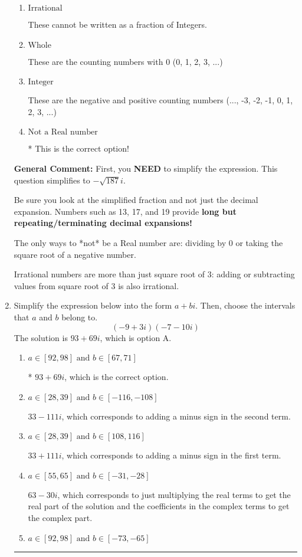 \documentclass{extbook}[14pt]
\newcommand{\litem}[1]{\item #1

\rule{\textwidth}{0.4pt}}
\begin{document}
\begin{enumerate}
{\begin{enumerate}[label=\Alph*.]
These are numbers that can be written as fraction of Integers (e.g., -2/3)
\item \( \text{Irrational} \)

These cannot be written as a fraction of Integers.
\item \( \text{Whole} \)

These are the counting numbers with 0 (0, 1, 2, 3, ...)
\item \( \text{Integer} \)

These are the negative and positive counting numbers (..., -3, -2, -1, 0, 1, 2, 3, ...)
\item \( \text{Not a Real number} \)

* This is the correct option!
\end{enumerate}

\textbf{General Comment:} First, you \textbf{NEED} to simplify the expression. This question simplifies to $-\sqrt{187} i$. 
 
 Be sure you look at the simplified fraction and not just the decimal expansion. Numbers such as 13, 17, and 19 provide \textbf{long but repeating/terminating decimal expansions!} 
 
 The only ways to *not* be a Real number are: dividing by 0 or taking the square root of a negative number. 
 
 Irrational numbers are more than just square root of 3: adding or subtracting values from square root of 3 is also irrational.
}
\litem{
Simplify the expression below into the form $a+bi$. Then, choose the intervals that $a$ and $b$ belong to.
\[ (-9 + 3 i)(-7 - 10 i) \]
The solution is \( 93 + 69 i \), which is option A.\begin{enumerate}[label=\Alph*.]
\item \( a \in [92, 98] \text{ and } b \in [67, 71] \)

* $93 + 69 i$, which is the correct option.
\item \( a \in [28, 39] \text{ and } b \in [-116, -108] \)

 $33 - 111 i$, which corresponds to adding a minus sign in the second term.
\item \( a \in [28, 39] \text{ and } b \in [108, 116] \)

 $33 + 111 i$, which corresponds to adding a minus sign in the first term.
\item \( a \in [55, 65] \text{ and } b \in [-31, -28] \)

 $63 - 30 i$, which corresponds to just multiplying the real terms to get the real part of the solution and the coefficients in the complex terms to get the complex part.
\item \( a \in [92, 98] \text{ and } b \in [-73, -65] \)


\end{enumerate}}
\end{enumerate}
\end{document}
